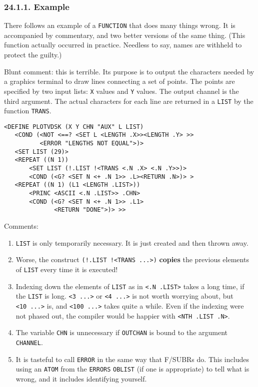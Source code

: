 \documentclass[a4paper,]{article}
\providecommand{\tightlist}{%
  \setlength{\itemsep}{0pt}\setlength{\parskip}{0pt}}
\begin{document}
\subsubsection{24.1.1. Example}\label{example-2}

There follows an example of a \texttt{FUNCTION} that does many things wrong. It is accompanied by commentary, and two
better versions of the same thing. (This function actually occurred in practice. Needless to say, names are withheld to
protect the guilty.)

Blunt comment: this is terrible. Its purpose is to output the characters needed by a graphics terminal to draw lines
connecting a set of points. The points are specified by two input lists: \texttt{X} values and \texttt{Y} values. The
output channel is the third argument. The actual characters for each line are returned in a \texttt{LIST} by the function
\texttt{TRANS}.

\begin{verbatim}
<DEFINE PLOTVDSK (X Y CHN "AUX" L LIST)
   <COND (<NOT <==? <SET L <LENGTH .X>><LENGTH .Y> >>
          <ERROR "LENGTHS NOT EQUAL">)>
   <SET LIST (29)>
   <REPEAT ((N 1))
       <SET LIST (!.LIST !<TRANS <.N .X> <.N .Y>>)>
       <COND (<G? <SET N <+ .N 1>> .L><RETURN .N>)> >
   <REPEAT ((N 1) (L1 <LENGTH .LIST>))
       <PRINC <ASCII <.N .LIST>> .CHN>
       <COND (<G? <SET N <+ .N 1>> .L1>
              <RETURN "DONE">)> >>
\end{verbatim}

 

Comments:

\begin{enumerate}
\def\labelenumi{\arabic{enumi}.}
\tightlist
\item
  \texttt{LIST} is only temporarily necessary. It is just created and then thrown away.
\item
  Worse, the construct \texttt{(!.LIST\ !\textless{}TRANS\ ...\textgreater{})} \textbf{copies} the previous elements of
  \texttt{LIST} every time it is executed!
\item
  Indexing down the elements of \texttt{LIST} as in \texttt{\textless{}.N\ .LIST\textgreater{}} takes a long time, if the
  \texttt{LIST} is long. \texttt{\textless{}3\ ...\textgreater{}} or \texttt{\textless{}4\ ...\textgreater{}} is not worth
  worrying about, but \texttt{\textless{}10\ ...\textgreater{}} is, and \texttt{\textless{}100\ ...\textgreater{}} takes
  quite a while. Even if the indexing were not phased out, the compiler would be happier with
  \texttt{\textless{}NTH\ .LIST\ .N\textgreater{}}.
\item
  The variable \texttt{CHN} is unnecessary if \texttt{OUTCHAN} is bound to the argument \texttt{CHANNEL}.
\item
  It is tasteful to call \texttt{ERROR} in the same way that F/SUBRs do. This includes using an
  \texttt{ATOM} from the \texttt{ERRORS} \texttt{OBLIST} (if one is appropriate) to tell what is
  wrong, and it includes identifying yourself.
\end{enumerate}
\end{document}
